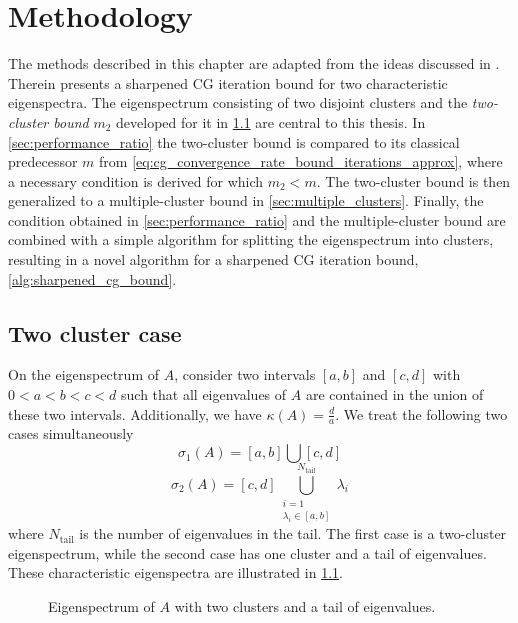 \chapter{Methodology}\label{ch:methods}
The methods described in this chapter are adapted from the ideas discussed in \cite[Section 4]{cg_sharpened_convrate_Axelsson1976}. Therein \citeauthor{cg_sharpened_convrate_Axelsson1976} presents a sharpened CG iteration bound for two characteristic eigenspectra. The eigenspectrum consisting of two disjoint clusters and the \textit{two-cluster bound} $m_2$ developed for it in \cref{sec:cg_sharpened_convrate} are central to this thesis. In \cref{sec:performance_ratio} the two-cluster bound is compared to its classical predecessor $m$ from \cref{eq:cg_convergence_rate_bound_iterations_approx}, where a necessary condition is derived for which $m_2 < m$. The two-cluster bound is then generalized to a multiple-cluster bound in \cref{sec:multiple_clusters}. Finally, the condition obtained in \cref{sec:performance_ratio} and the multiple-cluster bound are combined with a simple algorithm for splitting the eigenspectrum into clusters, resulting in a novel algorithm for a sharpened CG iteration bound, \cref{alg:sharpened_cg_bound}. 

\section{Two cluster case}\label{sec:cg_sharpened_convrate}
On the eigenspectrum of $A$, consider two intervals $[a, b]$ and $[c, d]$ with $0 < a < b < c < d$ such that all eigenvalues of $A$ are contained in the union of these two intervals. Additionally, we have $\kappa(A) = \frac{d}{a}$. We treat the following two cases simultaneously
\begin{equation}
    \sigma_1(A) = [a,b] \bigcup [c,d]
    \label{eq:two_clusters}
\end{equation}
\begin{equation}
    \sigma_2(A) = [c,d] \bigcup_{\substack{i=1 \\ \lambda_i \in [a,b]}}^{N_{\text{tail}}} \lambda_i
    \label{eq:one_cluster_with_tail}
\end{equation}
where $N_{\text{tail}}$ is the number of eigenvalues in the tail. The first case is a two-cluster eigenspectrum, while the second case has one cluster and a tail of eigenvalues. These characteristic eigenspectra are illustrated in \cref{fig:eigenvalue_clusters}.
\begin{figure}[H]
    \centering
    
    \caption{Eigenspectrum of $A$ with two clusters and a tail of eigenvalues.}
    \label{fig:eigenvalue_clusters}
\end{figure}

